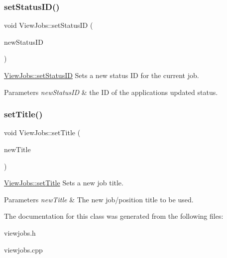 \subsubsection{\texorpdfstring{set\+Status\+I\+D()}{setStatusID()}}
{\footnotesize\ttfamily void View\+Jobs\+::set\+Status\+ID (\begin{DoxyParamCaption}\item[{int}]{new\+Status\+ID }\end{DoxyParamCaption})}



\mbox{\hyperlink{class_view_jobs_a55943415fd91377d5f701f7074ba58d6}{View\+Jobs\+::set\+Status\+ID}} Sets a new status ID for the current job. 


\begin{DoxyParams}{Parameters}
{\em new\+Status\+ID} & the ID of the application\textquotesingle{}s updated status. \\
\hline
\end{DoxyParams}
\mbox{\label{class_view_jobs_abfe1969197cde57ea049c1b7d91cd4f5}} 
\subsubsection{\texorpdfstring{set\+Title()}{setTitle()}}
{\footnotesize\ttfamily void View\+Jobs\+::set\+Title (\begin{DoxyParamCaption}\item[{Q\+String}]{new\+Title }\end{DoxyParamCaption})}



\mbox{\hyperlink{class_view_jobs_abfe1969197cde57ea049c1b7d91cd4f5}{View\+Jobs\+::set\+Title}} Sets a new job title. 


\begin{DoxyParams}{Parameters}
{\em new\+Title} & The new job/position title to be used. \\
\hline
\end{DoxyParams}


The documentation for this class was generated from the following files\+:\begin{DoxyCompactItemize}
\item 
viewjobs.\+h\item 
viewjobs.\+cpp\end{DoxyCompactItemize}
